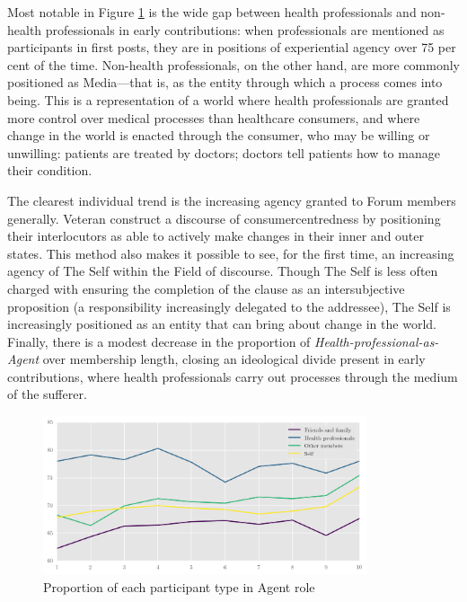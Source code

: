 Most notable in Figure \ref{fig:key_proc_for_parts} is the wide gap between health professionals and non\hyp{}health professionals in early contributions: when professionals are mentioned as participants in first \glspl{post}, they are in positions of experiential agency over 75 per cent of the time. Non\hyp{}health professionals, on the other hand, are more commonly positioned as Media---that is, as the entity through which a process comes into being. This is a representation of a world where health professionals are granted more control over medical processes than healthcare \glspl{consumer}, and where change in the world is enacted through the consumer, who may be willing or unwilling: patients are treated by doctors; doctors tell patients how to manage their condition. 

The clearest individual trend is the increasing agency granted to \gls{Forum} \glspl{member} generally. Veteran  construct a discourse of \gls{consumercentred}ness by positioning their interlocutors as able to actively make changes in their inner and outer states. This method also makes it possible to see, for the first time, an increasing agency of The Self within the Field of discourse. Though The Self is less often charged with ensuring the completion of the clause as an intersubjective proposition (a responsibility increasingly delegated to the addressee), The Self is increasingly positioned as an entity that can bring about change in the world. Finally, there is a modest decrease in the proportion of \emph{Health\hyp{}professional\hyp{}as\hyp{}Agent} over membership length, closing an ideological divide present in early contributions, where health professionals carry out processes through the medium of the sufferer.

\begin{figure}[htb]
    \centering
    \includegraphics[width=0.85\textwidth]{../images/percentage-agent.png}
    \caption{Proportion of each participant type in Agent role}
    \label{fig:key_proc_for_parts}
    \end{figure}

